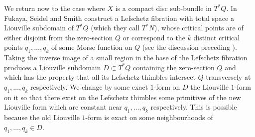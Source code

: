 \documentclass{article}
\theoremstyle{plain}%
\theoremstyle{definition}
\numberwithin{equation}{section}
\numberwithin{figure}{section}
\begin{document}
We return now to the case where $X$ is a compact disc sub-bundle in $T^*Q.$ In \cite{FSS1} Fukaya, Seidel and Smith construct a Lefschetz fibration with total space a Liouville subdomain of $T^*Q$ (which they call $T^*N$), whose critical points are of either disjoint from the zero-section $Q$ or correspond to the $k$ distinct critical points $q_1,\dots,q_k$ of some Morse function on $Q$ (see the discussion preceding  \cite[Lemma 7]{FSS1}). Taking the inverse image of a small region in the base of the Lefschetz fibration produces a Liouville subdomain $D\subset T^*Q$ containing the zero-section $Q$ and which has the property that all its Lefschetz thimbles intersect $Q$ transversely at $q_1,\dots,q_k$ respectively. We change by some exact $1$-form on $D$ the Liouville $1$-form on it so that there exist on the Lefschetz thimbles some primitives of the new Liouville form which are constant near $q_1,\dots,q_k$ respectively. This is possible because the old Liouville $1$-form is exact on some neighbourhoods of $q_1,\dots,q_k\in D.$ 
\end{document}
